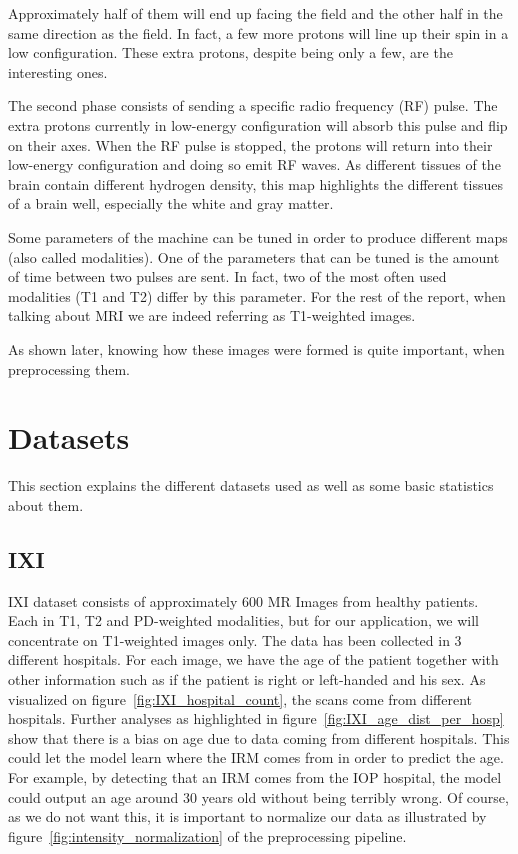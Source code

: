 Approximately half of them will end up facing the field and the other half in the same direction as the field. In fact, a few more protons will line up their spin in a low configuration. These extra protons, despite being only a few, are the interesting ones.

The second phase consists of sending a specific radio frequency (RF) pulse. The extra protons currently in low-energy configuration will absorb this pulse and flip on their axes. When the RF pulse is stopped, the protons will return into their low-energy configuration and doing so emit RF waves. As different tissues of the brain contain different hydrogen density, this map highlights the different tissues of a brain well, especially the white and gray matter.

Some parameters of the machine can be tuned in order to produce different maps (also called modalities). One of the parameters that can be tuned is the amount of time between two pulses are sent. In fact, two of the most often used modalities (T1 and T2) differ by this parameter. For the rest of the report, when talking about MRI we are indeed referring as T1-weighted images.

As shown later, knowing how these images were formed is quite important, when preprocessing them.

\section{Datasets}
This section explains the different datasets used as well as some basic statistics about them.
\subsection{IXI}
IXI dataset consists of approximately 600 MR Images from healthy patients. Each in T1, T2 and PD-weighted modalities, but for our application, we will concentrate on T1-weighted images only. The data has been collected in 3 different hospitals. For each image, we have the age of the patient together with other information such as if the patient is right or left-handed and his sex. As visualized on figure~\ref{fig:IXI_hospital_count}, the scans come from different hospitals. Further analyses as highlighted in figure~\ref{fig:IXI_age_dist_per_hosp} show that there is a bias on age due to data coming from different hospitals. This could let the model learn where the IRM comes from in order to predict the age. For example, by detecting that an IRM comes from the IOP hospital, the model could output an age around 30 years old without being terribly wrong. Of course, as we do not want this, it is important to normalize our data as illustrated by figure~\ref{fig:intensity_normalization} of the preprocessing pipeline.

